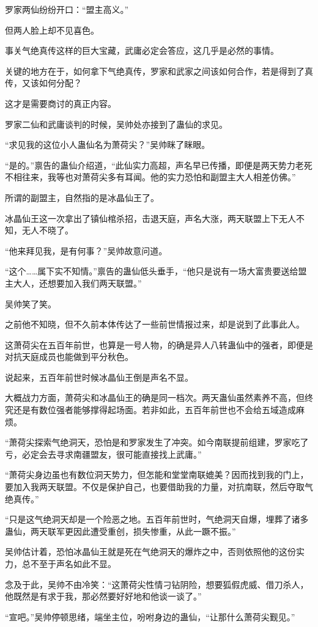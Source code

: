\begin{this_body}
罗家两仙纷纷开口：“盟主高义。”

但两人脸上却不见喜色。

事关气绝真传这样的巨大宝藏，武庸必定会答应，这几乎是必然的事情。

关键的地方在于，如何拿下气绝真传，罗家和武家之间该如何合作，若是得到了真传，又该如何分配？

这才是需要商讨的真正内容。

罗家二仙和武庸谈判的时候，吴帅处亦接到了蛊仙的求见。

“求见我的这位小人蛊仙名为萧荷尖？”吴帅眯了眯眼。

“是的。”禀告的蛊仙介绍道，“此仙实力高超，声名早已传播，即便是两天势力老死不相往来，我等也对萧荷尖多有耳闻。他的实力恐怕和副盟主大人相差仿佛。”

所谓的副盟主，自然指的是冰晶仙王了。

冰晶仙王这一次拿出了镇仙棺杀招，击退天庭，声名大涨，两天联盟上下无人不知，无人不晓了。

“他来拜见我，是有何事？”吴帅故意问道。

“这个……属下实不知情。”禀告的蛊仙低头垂手，“他只是说有一场大富贵要送给盟主大人，还想要加入我们两天联盟。”

吴帅笑了笑。

之前他不知晓，但不久前本体传达了一些前世情报过来，却是说到了此事此人。

这萧荷尖在五百年前世，也算是一号人物，的确是异人八转蛊仙中的强者，即便是对抗天庭成员也能做到平分秋色。

说起来，五百年前世时候冰晶仙王倒是声名不显。

大概战力方面，萧荷尖和冰晶仙王的确是同一档次。两天蛊仙虽然素养不高，但终究还是有数位强者能够撑得起场面。若非如此，五百年前世也不会给五域造成麻烦。

“萧荷尖探索气绝洞天，恐怕是和罗家发生了冲突。如今南联提前组建，罗家吃了亏，必定会去寻求南疆盟友，很可能直接找上武庸。”

“萧荷尖身边虽也有数位洞天势力，但怎能和堂堂南联媲美？因而找到我的门上，要加入我两天联盟。不仅是保护自己，也要借助我的力量，对抗南联，然后夺取气绝真传。”

“只是这气绝洞天却是一个险恶之地。五百年前世时，气绝洞天自爆，埋葬了诸多蛊仙，两天联军更因此遭受重创，损失惨重，从此一蹶不振。”

吴帅估计着，恐怕冰晶仙王就是死在气绝洞天的爆炸之中，否则依照他的这份实力，总不至于声名如此不显。

念及于此，吴帅不由冷笑：“这萧荷尖性情刁钻阴险，想要狐假虎威、借刀杀人，他既然是有求于我，那必然要好好地和他谈一谈了。”

“宣吧。”吴帅停顿思绪，端坐主位，吩咐身边的蛊仙，“让那什么萧荷尖觐见。”

\end{this_body}


